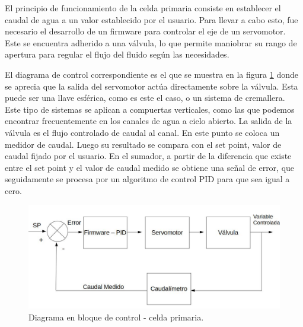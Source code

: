 El principio de funcionamiento de la celda primaria consiste en establecer el caudal de agua a un valor establecido por el usuario. Para llevar a cabo esto, fue necesario el desarrollo de un firmware para controlar el eje de un servomotor. Este se encuentra adherido a una válvula, lo que permite maniobrar su rango de apertura para regular el flujo del fluido según las necesidades.

El diagrama de control correspondiente es el que se muestra en la figura \ref{fig:CeldaPrimaria} donde se aprecia que la salida del servomotor actúa directamente sobre la válvula. Esta puede ser una llave esférica, como es este el caso, o un sistema de cremallera. Este tipo de sistemas se aplican a compuertas verticales, como las que podemos encontrar frecuentemente en los canales de agua a cielo abierto. La salida de la válvula es el flujo controlado de caudal al canal. En este punto se coloca un medidor de caudal. Luego su resultado se compara con el set point, valor de caudal fijado por el usuario. En el sumador, a partir de la diferencia que existe entre el set point y el valor de caudal medido se obtiene una señal de error, que seguidamente se procesa por un algoritmo de control PID para que sea igual a cero.

\begin{figure}[htpb]
\centering
\includegraphics[scale=.45]{./Figures/DiagramaEnBloqueDeControlCeldaPrimaria-V5.png}
\caption{Diagrama en bloque de control - celda primaria.}
\label{fig:CeldaPrimaria}
\end{figure}

